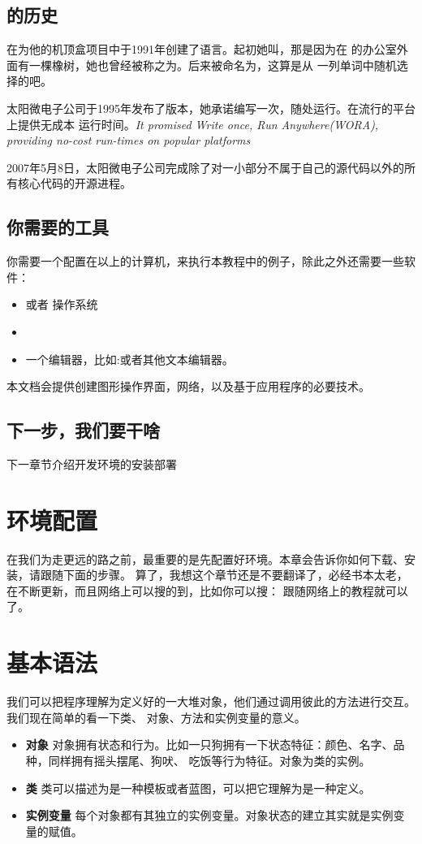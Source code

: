 \documentclass{article}
\begin{document}
\subsection{的历史}
在为他的机顶盒项目中于1991年创建了语言。起初她叫，那是因为在
的办公室外面有一棵橡树，她也曾经被称之为。后来被命名为，这算是从
一列单词中随机选择的吧。

太阳微电子公司于1995年发布了版本，她承诺编写一次，随处运行。在流行的平台上提供无成本
运行时间。\textit{It promised Write once, Run Anywhere(WORA), providing no-cost run-times on popular platforms}

2007年5月8日，太阳微电子公司完成除了对一小部分不属于自己的源代码以外的所有核心代码的开源进程。

\subsection{你需要的工具}
你需要一个配置在以上的计算机，来执行本教程中的例子，除此之外还需要一些软件：
\begin{itemize}
\item {} 或者  操作系统
\item {}
\item 一个编辑器，比如:或者其他文本编辑器。
\end{itemize}
本文档会提供创建图形操作界面，网络，以及基于应用程序的必要技术。

\subsection{下一步，我们要干啥}
下一章节介绍开发环境的安装部署

\section{环境配置}
在我们为走更远的路之前，最重要的是先配置好环境。本章会告诉你如何下载、安装，请跟随下面的步骤。
算了，我想这个章节还是不要翻译了，必经书本太老，在不断更新，而且网络上可以搜的到，比如你可以搜：
 跟随网络上的教程就可以了。%

\section{ 基本语法}
我们可以把程序理解为定义好的一大堆对象，他们通过调用彼此的方法进行交互。我们现在简单的看一下类、
对象、方法和实例变量的意义。
\begin{itemize}
\item {\bf 对象} 对象拥有状态和行为。比如一只狗拥有一下状态特征：颜色、名字、品种，同样拥有摇头摆尾、狗吠、
吃饭等行为特征。对象为类的实例。
\item {\bf 类} 类可以描述为是一种模板或者蓝图，可以把它理解为是一种定义。
\item {\bf 实例变量} 每个对象都有其独立的实例变量。对象状态的建立其实就是实例变量的赋值。
\end{itemize}
\end{document}
